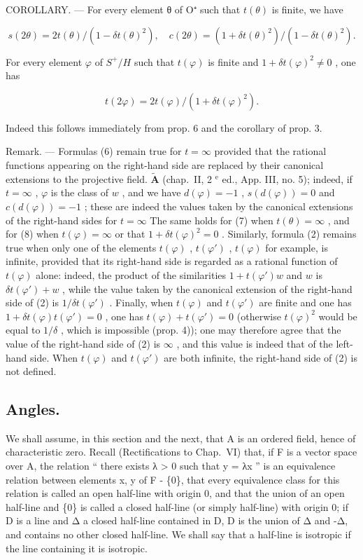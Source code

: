 COROLLARY. --- For every element θ of O⁺ such that \(t(\theta)\) is finite, we have

\[
s (2 \theta) = 2 t (\theta) / (1 - \delta t (\theta) ^ {2}), \quad c (2 \theta) = (1 + \delta t (\theta) ^ {2}) / (1 - \delta t (\theta) ^ {2}). \tag {7}
\]

For every element \(\varphi\) of \(S^{+}/H\) such that \(t(\varphi)\) is finite and \(1 + \delta t(\varphi)^{2} \neq 0\) , one has

\[
t (2 \varphi) = 2 t (\varphi) / (1 + \delta t (\varphi) ^ {2}).\tag{8}
\]

Indeed this follows immediately from prop. 6 and the corollary of prop. 3.

Remark. --- Formulas (6) remain true for \(t = \infty\) provided that the rational functions appearing on the right-hand side are replaced by their canonical extensions to the projective field. \(\tilde{\mathbf{A}}\) (chap.~II, 2 \(^{\text{e}}\) ed., App. III, no. 5); indeed, if \(t = \infty\) , \(\varphi\) is the class of \(w\) , and we have \(d(\varphi) = -1\) , \(s(d(\varphi)) = 0\) and \(c(d(\varphi)) = -1\) ; these are indeed the values taken by the canonical extensions of the right-hand sides for \(t = \infty\) The same holds for (7) when \(t(\theta) = \infty\) , and for (8) when \(t(\varphi) = \infty\) or that \(1 + \delta t(\varphi)^{2} = 0\) . Similarly, formula (2) remains true when only one of the elements \(t(\varphi)\) , \(t(\varphi')\) , \(t(\varphi)\) for example, is infinite, provided that its right-hand side is regarded as a rational function of \(t(\varphi)\) alone: indeed, the product of the similarities \(1 + t(\varphi')w\) and \(w\) is \(\delta t(\varphi') + w\) , while the value taken by the canonical extension of the right-hand side of (2) is \(1/\delta t(\varphi')\) . Finally, when \(t(\varphi)\) and \(t(\varphi')\) are finite and one has \(1 + \delta t(\varphi)t(\varphi') = 0\) , one has \(t(\varphi) + t(\varphi') = 0\) (otherwise \(t(\varphi)^{2}\) would be equal to \(1/\delta\) , which is impossible (prop. 4)); one may therefore agree that the value of the right-hand side of (2) is \(\infty\) , and this value is indeed that of the left-hand side. When \(t(\varphi)\) and \(t(\varphi')\) are both infinite, the right-hand side of (2) is not defined.

\subsection{Angles.}

We shall assume, in this section and the next, that A is an ordered field, hence of characteristic zero. Recall (Rectifications to Chap.~VI) that, if F is a vector space over A, the relation “ there exists λ \textgreater{} 0 such that y = λx ” is an equivalence relation between elements x, y of F - \{0\}, that every equivalence class for this relation is called an open half-line with origin 0, and that the union of an open half-line and \{0\} is called a closed half-line (or simply half-line) with origin 0; if D is a line and Δ a closed half-line contained in D, D is the union of Δ and -Δ, and contains no other closed half-line. We shall say that a half-line is isotropic if the line containing it is isotropic.

